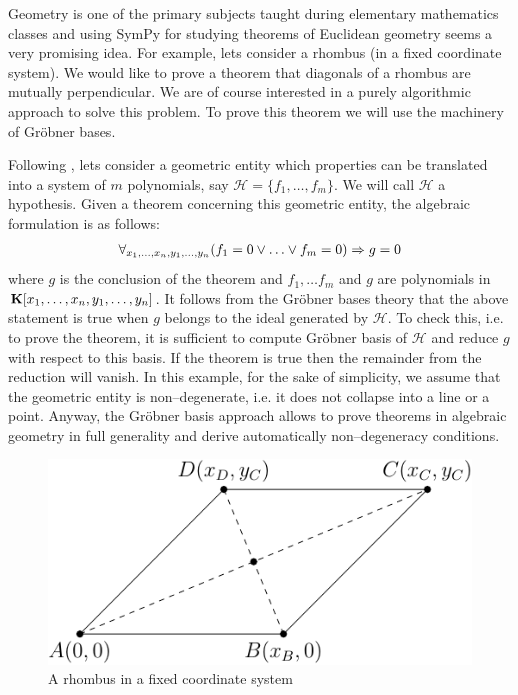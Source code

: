 Geometry is one of the primary subjects taught during elementary mathematics classes and using SymPy for
studying theorems of Euclidean geometry seems a very promising idea. For example, lets consider a rhombus
(in a fixed coordinate system). We would like to prove a theorem that diagonals of a rhombus are mutually
perpendicular. We are of course interested in a purely algorithmic approach to solve this problem. To prove
this theorem we will use the machinery of Gröbner bases.

Following \cite{Winkler1990geometry}, lets consider a geometric entity which properties can be translated into a
system of $m$ polynomials, say $\mathcal{H} = \{f_1, \ldots, f_m\}$. We will call $\mathcal{H}$ a hypothesis.
Given a theorem concerning this geometric entity, the algebraic formulation is as follows:
\begin{gather}
\begin{split}\forall_{x_1, \ldots, x_n, y_1, \ldots, y_n} (f_1 = 0 \vee \ldots \vee f_m = 0) \Rightarrow g = 0\end{split}\notag
\end{gather}
where $g$ is the conclusion of the theorem and $f_1, \ldots f_m$ and $g$ are polynomials in $\mathbf{K}[x_1, \ldots,
x_n, y_1, \ldots, y_n]$. It follows from the Gröbner bases theory that the above statement is true when $g$
belongs to the ideal generated by $\mathcal{H}$. To check this, i.e. to prove the theorem, it is sufficient
to compute Gröbner basis of $\mathcal{H}$ and reduce $g$ with respect to this basis. If the theorem is
true then the remainder from the reduction will vanish. In this example, for the sake of simplicity, we
assume that the geometric entity is non--degenerate, i.e. it does not collapse into a line or a point.
Anyway, the Gröbner basis approach allows to prove theorems in algebraic geometry in full generality
and derive automatically non--degeneracy conditions.
\begin{figure}[htbp]
\centering

\includegraphics{geometry-rhombus.pdf}
\caption{A rhombus in a fixed coordinate system\label{fig-geometry-rhombus}}\end{figure}

